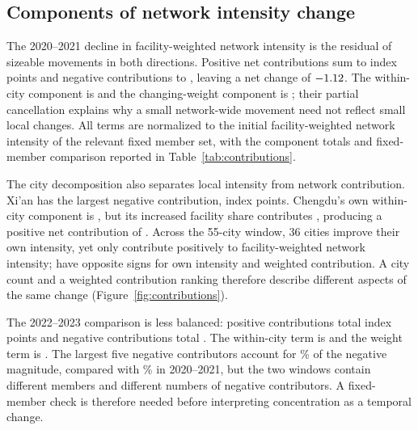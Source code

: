 \subsection{Components of network intensity change}
The 2020--2021 decline in facility-weighted network intensity is the residual of sizeable movements in both directions. Positive net contributions sum to \MiddlePositive{} index points and negative contributions to \MiddleNegative, leaving a net change of $-1.12$. The within-city component is \MiddleWithin{} and the changing-weight component is \MiddleComposition; their partial cancellation explains why a small network-wide movement need not reflect small local changes. All terms are normalized to the initial facility-weighted network intensity of the relevant fixed member set, with the component totals and fixed-member comparison reported in Table~\ref{tab:contributions}.

The city decomposition also separates local intensity from network contribution. Xi'an has the largest negative contribution, \MiddleXianNet{} index points. Chengdu's own within-city component is \MiddleChengduWithin, but its increased facility share contributes \MiddleChengduComposition, producing a positive net contribution of \MiddleChengduNet. Across the 55-city window, 36 cities improve their own intensity, yet only \MiddleNetPositive{} contribute positively to facility-weighted network intensity; \MiddleMismatch{} have opposite signs for own intensity and weighted contribution. A city count and a weighted contribution ranking therefore describe different aspects of the same change (Figure~\ref{fig:contributions}).

The 2022--2023 comparison is less balanced: positive contributions total \RecentPositive{} index points and negative contributions total \RecentNegative. The within-city term is \RecentWithin{} and the weight term is \RecentComposition. The largest five negative contributors account for \RecentNegativeTopShare\% of the negative magnitude, compared with \MiddleNegativeTopShare\% in 2020--2021, but the two windows contain different members and different numbers of negative contributors. A fixed-member check is therefore needed before interpreting concentration as a temporal change.

